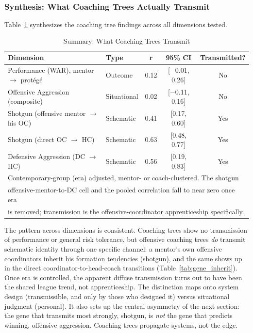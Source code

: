 \documentclass[USenglish]{article}
\theoremstyle{dgthm}
\theoremstyle{dgdef}
\begin{document}
\subsubsection{Synthesis: What Coaching Trees Actually Transmit}

Table~\ref{tab:tree_summary} synthesizes the coaching tree findings across all dimensions tested.

\begin{table}[H]
\caption{Summary: What Coaching Trees Transmit}
\label{tab:tree_summary}
\begin{tabular}{llccc}
\toprule
\textbf{Dimension} & \textbf{Type} & \textbf{r} & \textbf{95\% CI} & \textbf{Transmitted?} \\
\midrule
Performance (WAR), mentor $\to$ prot\'{e}g\'{e} & Outcome & 0.12 & [$-$0.01, 0.26] & No \\
Offensive Aggression (composite) & Situational & 0.02 & [$-$0.11, 0.16] & No \\
Shotgun (offensive mentor $\to$ his OC) & Schematic & 0.41 & [0.17, 0.60] & Yes \\
Shotgun (direct OC $\to$ HC) & Schematic & 0.63 & [0.48, 0.77] & Yes \\
Defensive Aggression (DC $\to$ HC) & Schematic & 0.56 & [0.19, 0.83] & Yes \\
\midrule
\multicolumn{5}{l}{\small Contemporary-group (era) adjusted, mentor- or coach-clustered. The shotgun}\\
\multicolumn{5}{l}{\small offensive-mentor-to-DC cell and the pooled correlation fall to near zero once era}\\
\multicolumn{5}{l}{\small is removed; transmission is the offensive-coordinator apprenticeship specifically.}\\
\bottomrule
\end{tabular}
\end{table}

The pattern across dimensions is consistent. Coaching trees show no transmission of performance or general risk tolerance, but offensive coaching trees \emph{do} transmit schematic identity through one specific channel: a mentor's own offensive coordinators inherit his formation tendencies (shotgun), and the same shows up in the direct coordinator-to-head-coach transitions (Table~\ref{tab:gene_inherit}). Once era is controlled, the apparent diffuse transmission turns out to have been the shared league trend, not apprenticeship. The distinction maps onto system design (transmissible, and only by those who designed it) versus situational judgment (personal). It also sets up the central asymmetry of the next section: the gene that transmits most strongly, shotgun, is \emph{not} the gene that predicts winning, offensive aggression. Coaching trees propagate systems, not the edge.
\end{document}
